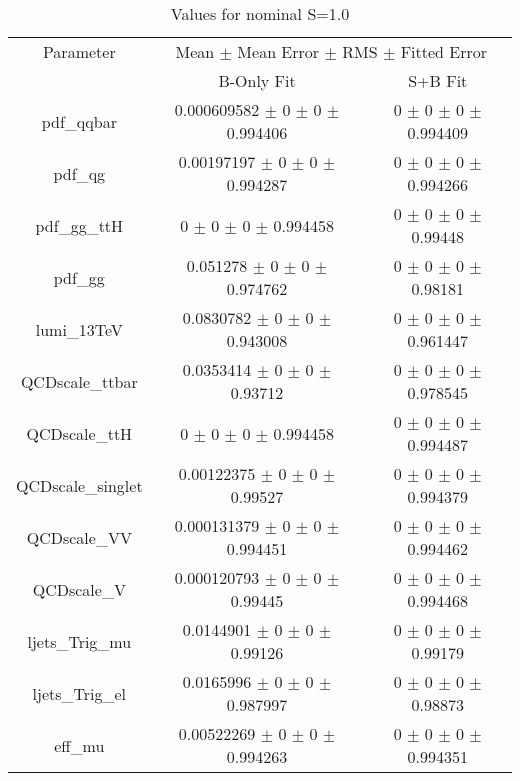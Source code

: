 \begin{table}
\centering
\caption{Values for nominal S=1.0}
\begin{tabular}{ccc}
\toprule
Parameter 	& \multicolumn{2}{c}{Mean $\pm$ Mean Error $\pm$ RMS $\pm$ Fitted Error}\\
 	& B-Only Fit & S+B Fit\\
\midrule
pdf\_qqbar 	& \num{0.000609582} $\pm$ \num{0} $\pm$ \num{0} $\pm$ \num{0.994406} 	& \num{0} $\pm$ \num{0} $\pm$ \num{0} $\pm$ \num{0.994409}\\
pdf\_qg 	& \num{0.00197197} $\pm$ \num{0} $\pm$ \num{0} $\pm$ \num{0.994287} 	& \num{0} $\pm$ \num{0} $\pm$ \num{0} $\pm$ \num{0.994266}\\
pdf\_gg\_ttH 	& \num{0} $\pm$ \num{0} $\pm$ \num{0} $\pm$ \num{0.994458} 	& \num{0} $\pm$ \num{0} $\pm$ \num{0} $\pm$ \num{0.99448}\\
pdf\_gg 	& \num{0.051278} $\pm$ \num{0} $\pm$ \num{0} $\pm$ \num{0.974762} 	& \num{0} $\pm$ \num{0} $\pm$ \num{0} $\pm$ \num{0.98181}\\
lumi\_13TeV 	& \num{0.0830782} $\pm$ \num{0} $\pm$ \num{0} $\pm$ \num{0.943008} 	& \num{0} $\pm$ \num{0} $\pm$ \num{0} $\pm$ \num{0.961447}\\
QCDscale\_ttbar 	& \num{0.0353414} $\pm$ \num{0} $\pm$ \num{0} $\pm$ \num{0.93712} 	& \num{0} $\pm$ \num{0} $\pm$ \num{0} $\pm$ \num{0.978545}\\
QCDscale\_ttH 	& \num{0} $\pm$ \num{0} $\pm$ \num{0} $\pm$ \num{0.994458} 	& \num{0} $\pm$ \num{0} $\pm$ \num{0} $\pm$ \num{0.994487}\\
QCDscale\_singlet 	& \num{0.00122375} $\pm$ \num{0} $\pm$ \num{0} $\pm$ \num{0.99527} 	& \num{0} $\pm$ \num{0} $\pm$ \num{0} $\pm$ \num{0.994379}\\
QCDscale\_VV 	& \num{0.000131379} $\pm$ \num{0} $\pm$ \num{0} $\pm$ \num{0.994451} 	& \num{0} $\pm$ \num{0} $\pm$ \num{0} $\pm$ \num{0.994462}\\
QCDscale\_V 	& \num{0.000120793} $\pm$ \num{0} $\pm$ \num{0} $\pm$ \num{0.99445} 	& \num{0} $\pm$ \num{0} $\pm$ \num{0} $\pm$ \num{0.994468}\\
ljets\_Trig\_mu 	& \num{0.0144901} $\pm$ \num{0} $\pm$ \num{0} $\pm$ \num{0.99126} 	& \num{0} $\pm$ \num{0} $\pm$ \num{0} $\pm$ \num{0.99179}\\
ljets\_Trig\_el 	& \num{0.0165996} $\pm$ \num{0} $\pm$ \num{0} $\pm$ \num{0.987997} 	& \num{0} $\pm$ \num{0} $\pm$ \num{0} $\pm$ \num{0.98873}\\
eff\_mu 	& \num{0.00522269} $\pm$ \num{0} $\pm$ \num{0} $\pm$ \num{0.994263} 	& \num{0} $\pm$ \num{0} $\pm$ \num{0} $\pm$ \num{0.994351}\\

\end{tabular}
\end{table}
